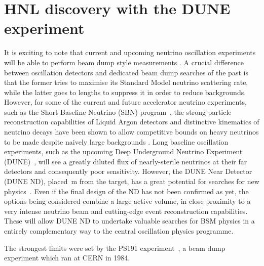 \clearpage
\chapter{HNL discovery with the DUNE experiment}
\label{cha:hnl_dune}

It is exciting to note that current and upcoming neutrino oscillation
experiments will be able to perform beam dump style measurements \cite{Kusenko:2004qc, Asaka:2012bb, Abe:2019kgx}. 
%
A crucial difference between oscillation detectors and dedicated beam dump searches of the past is that %
the former tries to maximise its Standard Model neutrino scattering rate, while the latter goes to lengths %
to suppress it in order to reduce backgrounds.
%
However, for some of the current and future accelerator neutrino experiments, %
such as the Short Baseline Neutrino (SBN) program~\cite{Antonello:2015lea}, %
the strong particle reconstruction capabilities of Liquid Argon detectors and distinctive kinematics %
of neutrino decays have been shown to allow competitive bounds on heavy neutrinos %
to be made despite naively large backgrounds \cite{Ballett:2016opr}. 
%
Long baseline oscillation experiments, such as the upcoming Deep Underground Neutrino Experiment (DUNE)~\cite{Abi:2018dnh}, %
will see a greatly diluted flux of nearly-sterile neutrinos at their far detectors and consequently poor sensitivity.
However, the DUNE Near Detector (DUNE ND), placed \,m from the target, has a great potential %
for searches for new physics~\cite{Adams:2013qkq}.
Even if the final design of the ND has not been confirmed as yet, the options being considered combine a large active volume, %
in close proximity to a very intense neutrino beam and cutting-edge event reconstruction capabilities.
These will allow DUNE ND to undertake valuable searches for BSM physics in a entirely complementary way %
to the central oscillation physics programme. 

The strongest limits were set by the PS191 experiment~\cite{Bernardi:1985ny, Bernardi:1987ek}, %
a beam dump experiment which ran at CERN in 1984.

